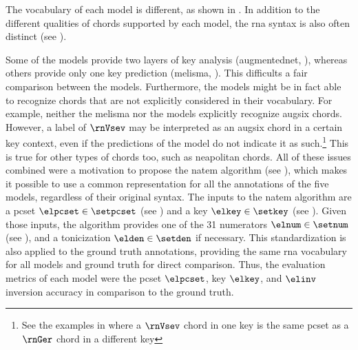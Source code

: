 
The vocabulary of each model is different, as shown in
. In addition to the different
qualities of chords supported by each model, the \gls{rna}
syntax is also often distinct (see
). 


Some of the models provide two layers of key analysis
(\gls{augmentednet}, \cite{micchi2021deep, chen2021attend}),
whereas others provide only one key prediction
(\gls{melisma}, \cite{mcleod2021modular}). This difficults a
fair comparison between the models. Furthermore, the models
might be in fact able to recognize chords that are not
explicitly considered in their vocabulary. For example,
neither the \gls{melisma} nor the
\textcite{mcleod2021modular} models explicitly recognize
\gls{augsix} chords. However, a label of $\rnVsev$ may be
interpreted as an \gls{augsix} chord in a certain key
context, even if the predictions of the model do not
indicate it as such.\footnote{See the examples in
 where a
$\rnVsev$ chord in one key is the same \gls{pcset} as a
$\rnGer$ chord in a different key} This is true for other
types of chords too, such as \gls{neapolitan} chords. All of
these issues combined were a motivation to propose the
\gls{natem} algorithm (see
), which
makes it possible to use a common representation for all the
annotations of the five models, regardless of their original
syntax. The inputs to the \gls{natem} algorithm are a
\gls{pcset} $\elpcset \in \setpcset$ (see
) and a key $\elkey
\in \setkey$ (see ).
Given those inputs, the algorithm provides one of the 31
numerators $\elnum \in \setnum$ (see
), and a
tonicization $\elden \in \setden$ if necessary. This
standardization is also applied to the ground truth
annotations, providing the same \gls{rna} vocabulary for all
models and ground truth for direct comparison. Thus, the
evaluation metrics of each model were the \gls{pcset}
$\elpcset$, key $\elkey$, and $\elinv$ inversion accuracy in
comparison to the ground truth.

